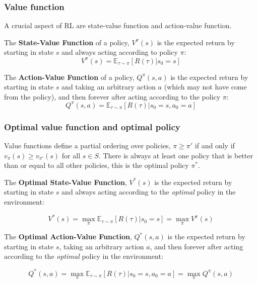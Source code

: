 \documentclass[9pt]{beamer}
\newcommand{\E}{{\mathbb E}}
\begin{document}
\begin{frame}

	\frametitle{Value function}

		A crucial aspect of RL are state-value function and action-value function.

		\begin{definition}
			The \textbf{State-Value Function} of a policy, $V^{\pi}(s)$ is the expected return by starting in state $s$ and always acting according to policy $\pi$:
			\begin{equation}
				V^{\pi}(s) = \E_{\tau \sim \pi} [R(\tau)| s_0 = s]
			\end{equation}
		\end{definition}

		\begin{definition}
			The \textbf{Action-Value Function} of a policy, $Q^{\pi}(s,a)$ is the expected return by starting in state $s$ and taking an arbitrary action $a$ (which may not have come from the policy), and then forever after acting according to the policy $\pi$:
			\begin{equation}
					Q^{\pi}(s,a) = \E_{\tau \sim \pi}[R(\tau)| s_0 = s, a_0 = a]	
			\end{equation}
			
		\end{definition}
	
\end{frame}





\begin{frame}
	\frametitle{Optimal value function and optimal policy }
	Value functions define a partial ordering over policies,
	$\pi \geq \pi'$ if and only if $v_\pi(s) \geq v_{\pi'}(s)$ for all $s \in S$. There is always at least one policy that is better than or equal to all other policies, this is the optimal policy $\pi^*$.

	\begin{definition}
		The \textbf{Optimal State-Value Function}, $V^*(s)$ is the expected return by starting in state $s$ and always acting according to the \textit{optimal} policy in the environment:
		
		\begin{equation}
			V^{*}(s) = \max_\pi \E_{\tau \sim \pi} [R(\tau)| s_0 = s] = \max_\pi V^\pi(s)
		\end{equation}
	\end{definition}

	\begin{definition}
		The \textbf{Optimal Action-Value Function}, $Q^*(s,a)$ is the expected return by starting in state $s$, taking an arbitrary action $a$, and then forever after acting according to the \textit{optimal} policy in the environment:
		
		\begin{equation}
		Q^*(s,a) = \max_{\pi} \E_{\tau \sim \pi}{[R(\tau)| s_0 = s, a_0 = a]} = \max_\pi Q^\pi(s,a)
		\end{equation}
	\end{definition}

\end{frame}
\end{document}
